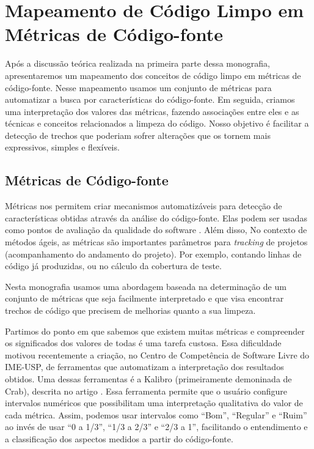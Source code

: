 \chapter{Mapeamento de Código Limpo em Métricas de Código-fonte}
\label{chap:mapeamento}	

Após a discussão teórica realizada na primeira parte dessa 	monografia, apresentaremos um mapeamento dos conceitos de código limpo em métricas de código-fonte. Nesse mapeamento usamos um conjunto de métricas para automatizar a busca por características do código-fonte. Em seguida, criamos uma interpretação dos valores das métricas, fazendo associações entre eles e as técnicas e conceitos relacionados a limpeza do código. Nosso objetivo é facilitar a detecção de trechos que poderiam sofrer alterações que os tornem mais expressivos, simples e flexíveis.


\section{Métricas de Código-fonte}

Métricas nos permitem criar mecanismos automatizáveis para detecção de características obtidas através da análise do código-fonte. Elas podem ser usadas como pontos de avaliação da qualidade do software \citep{meirelles:sbqs09}. Além disso, No contexto de métodos ágeis, as métricas são importantes parâmetros para \textit{tracking} de projetos (acompanhamento do andamento do projeto). Por exemplo, contando linhas de código já produzidas, ou no cálculo da cobertura de teste.	
                                                                                       
Nesta monografia usamos uma abordagem baseada na determinação de um conjunto de métricas que seja facilmente interpretado e que visa encontrar trechos de código que precisem de melhorias quanto a sua limpeza.

Partimos do ponto em que sabemos que existem muitas métricas e compreender os significados dos valores de todas é uma tarefa custosa. Essa dificuldade motivou recentemente a criação, no Centro de Competência de Software Livre do IME-USP, de ferramentas que automatizam a interpretação dos resultados obtidos. Uma dessas ferramentas é a Kalibro (primeiramente demoninada de Crab), descrita no artigo \citep{meirelles:sbes09}. Essa ferramenta permite que o usuário configure intervalos numéricos que possibilitam uma interpretação qualitativa do valor de cada métrica. Assim, podemos usar intervalos como ``Bom'', ``Regular'' e ``Ruim'' ao invés de usar ``0 a 1/3'', ``1/3 a 2/3'' e ``2/3 a 1'', facilitando o entendimento e a classificação dos aspectos medidos a partir do código-fonte.

